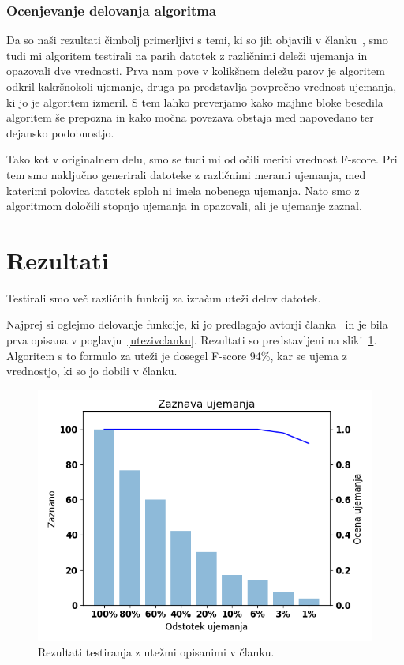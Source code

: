 \documentclass{acm_proc_article-sp}
\begin{document}
\subsubsection{Ocenjevanje delovanja algoritma}
Da so naši rezultati čimbolj primerljivi s temi, ki so jih objavili v članku~\cite{fbhash}, smo tudi mi algoritem testirali na parih datotek z različnimi deleži ujemanja in opazovali dve vrednosti. Prva nam pove v kolikšnem deležu parov je algoritem odkril kakršnokoli ujemanje, druga pa predstavlja povprečno vrednost ujemanja, ki jo je algoritem izmeril. S tem lahko preverjamo kako majhne bloke besedila algoritem še prepozna in kako močna povezava obstaja med napovedano ter dejansko podobnostjo.

Tako kot v originalnem delu, smo se tudi mi odločili meriti vrednost F-score. Pri tem smo naključno generirali datoteke z različnimi merami ujemanja, med katerimi polovica datotek sploh ni imela nobenega ujemanja. Nato smo z algoritmom določili stopnjo ujemanja in opazovali, ali je ujemanje zaznal.

\section{Rezultati}
Testirali smo več različnih funkcij za izračun uteži delov datotek.

Najprej si oglejmo delovanje funkcije, ki jo predlagajo avtorji članka~\cite{fbhash} in je bila prva opisana v poglavju~\ref{utezivclanku}. Rezultati so predstavljeni na sliki~\ref{fig:clanekUtezi}. Algoritem s to formulo za uteži je dosegel F-score 94\%, kar se ujema z vrednostjo, ki so jo dobili v članku.
\begin{figure}[htb]
\begin{center}
\includegraphics[width=1\columnwidth]{njihov_majhen.png}
\end{center}
\caption{\small{Rezultati testiranja z utežmi opisanimi v članku.}}
\label{fig:clanekUtezi}
\end{figure}
\end{document}
